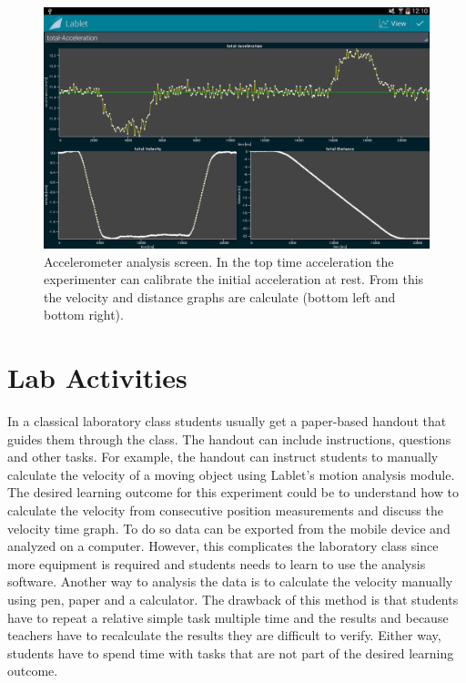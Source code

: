 \documentclass{sigchi}
\begin{document}
\begin{figure}[ht]
\centering
\includegraphics[width=.99\columnwidth]{AccelerometerAnalysis}
\caption{Accelerometer analysis screen.
In the top time acceleration the experimenter can calibrate the initial acceleration at rest.
From this the velocity and distance graphs are calculate (bottom left and bottom right).\label{fig:AccelerometerAnalysis}
}
\end{figure}

\section{Lab Activities}
In a classical laboratory class students usually get a paper-based handout that guides them through the class.
The handout can include instructions, questions and other tasks.
For example, the handout can instruct students to manually calculate the velocity of a moving object using Lablet's motion analysis module.
The desired learning outcome for this experiment could be to understand how to calculate the velocity from consecutive position measurements and discuss the velocity time graph.
To do so data can be exported from the mobile device and analyzed on a computer.
However, this complicates the laboratory class since more equipment is required and students needs to learn to use the analysis software.
Another way to analysis the data is to calculate the velocity manually using pen, paper and a calculator.
The drawback of this method is that students have to repeat a relative simple task multiple time and the results and because teachers have to recalculate the results they are difficult to verify.
Either way, students have to spend time with tasks that are not part of the desired learning outcome.
\end{document}

